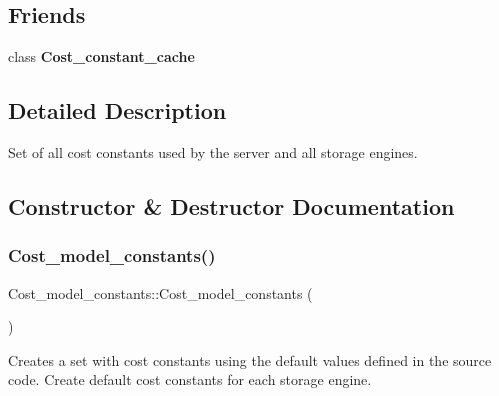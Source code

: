 \subsection*{Friends}
\begin{DoxyCompactItemize}
\item 
\mbox{\label{classCost__model__constants_af415bcef5b0ddd5323a019be898184e7}} 
class {\bfseries Cost\+\_\+constant\+\_\+cache}
\end{DoxyCompactItemize}


\subsection{Detailed Description}
Set of all cost constants used by the server and all storage engines. 

\subsection{Constructor \& Destructor Documentation}
\mbox{\label{classCost__model__constants_abfea15c18cc6e5fd5f628a867ca697af}} 
\subsubsection{\texorpdfstring{Cost\+\_\+model\+\_\+constants()}{Cost\_model\_constants()}}
{\footnotesize\ttfamily Cost\+\_\+model\+\_\+constants\+::\+Cost\+\_\+model\+\_\+constants (\begin{DoxyParamCaption}{ }\end{DoxyParamCaption})}

Creates a set with cost constants using the default values defined in the source code. Create default cost constants for each storage engine.\mbox{\label{classCost__model__constants_ae47b6030a6f69f592639ea4e4b69274b}} 
